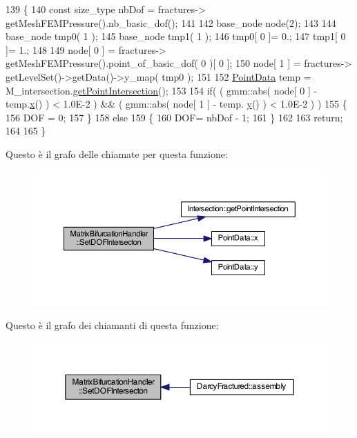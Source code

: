 \begin{DoxyCode}
139 \{
140     \textcolor{keyword}{const} size\_type nbDof =  fractures-> getMeshFEMPressure().nb\_basic\_dof();
141     
142     base\_node node(2);
143     
144     base\_node tmp0( 1 );
145     base\_node tmp1( 1 );
146     tmp0[ 0 ]= 0.;
147     tmp1[ 0 ]= 1.;
148     
149     node[ 0 ] = fractures-> getMeshFEMPressure().point\_of\_basic\_dof( 0 )[ 0 ];
150     node[ 1 ] = fractures-> getLevelSet()->getData()->y\_map( tmp0 );
151         
152     \hyperlink{classPointData}{PointData} temp = M\_intersection.\hyperlink{classIntersection_abfa3de3a738c4fd36c54eaeecc3557de}{getPointIntersection}();
153     
154     \textcolor{keywordflow}{if}( ( gmm::abs( node[ 0 ] - temp.\hyperlink{classPointData_a5accef5ea9e813dd4517eb050f276ccf}{x}() ) < 1.0E-2 ) && ( gmm::abs( node[ 1 ] - temp.
      \hyperlink{classPointData_a90dbf32a9579cb1cde67458d4ad38209}{y}() ) < 1.0E-2 ) )
155     \{
156         DOF = 0;
157     \}
158     \textcolor{keywordflow}{else} 
159     \{
160         DOF= nbDof - 1;
161     \}
162     
163     \textcolor{keywordflow}{return};
164             
165 \}\end{DoxyCode}


Questo è il grafo delle chiamate per questa funzione\-:\nopagebreak
\begin{figure}[H]
\begin{center}
\leavevmode
\includegraphics[width=350pt]{classMatrixBifurcationHandler_a4f0a8f707112cfd7576d2331f659e068_cgraph}
\end{center}
\end{figure}




Questo è il grafo dei chiamanti di questa funzione\-:\nopagebreak
\begin{figure}[H]
\begin{center}
\leavevmode
\includegraphics[width=350pt]{classMatrixBifurcationHandler_a4f0a8f707112cfd7576d2331f659e068_icgraph}
\end{center}
\end{figure}


